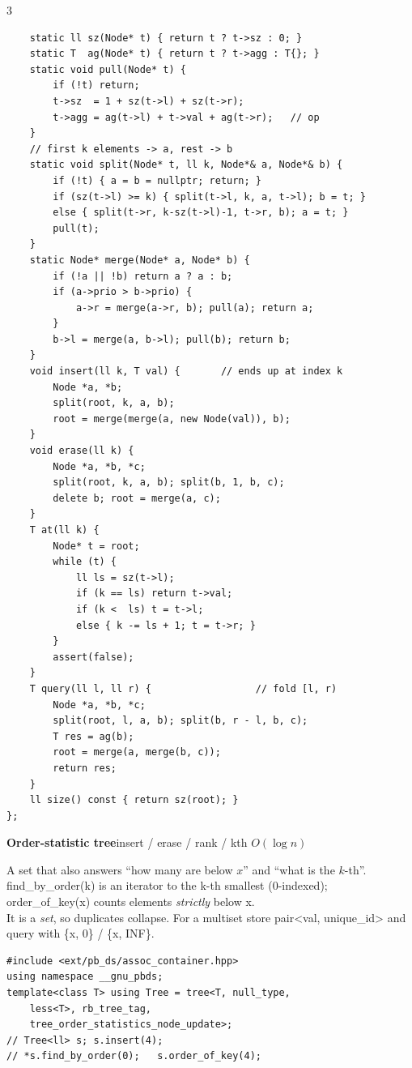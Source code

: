 \documentclass[9pt,a4paper]{extarticle}
\newcommand{\entry}[3]{%
  \addcontentsline{toc}{subsection}{#1}%
  \vspace{0.8ex}%
  \noindent\colorbox{hdbg}{\parbox{\dimexpr\columnwidth-2\fboxsep}{%
    \strut\textbf{#1}\hfill{\footnotesize\textsf{#2}}}}\par
  \vspace{0.4ex}%
  {\footnotesize #3\par}%
}
\newcommand{\code}[1]{{\ttfamily\small #1}}
\begin{document}
\begin{multicols*}{3}
\begin{lstlisting}
    static ll sz(Node* t) { return t ? t->sz : 0; }
    static T  ag(Node* t) { return t ? t->agg : T{}; }
    static void pull(Node* t) {
        if (!t) return;
        t->sz  = 1 + sz(t->l) + sz(t->r);
        t->agg = ag(t->l) + t->val + ag(t->r);   // op
    }
    // first k elements -> a, rest -> b
    static void split(Node* t, ll k, Node*& a, Node*& b) {
        if (!t) { a = b = nullptr; return; }
        if (sz(t->l) >= k) { split(t->l, k, a, t->l); b = t; }
        else { split(t->r, k-sz(t->l)-1, t->r, b); a = t; }
        pull(t);
    }
    static Node* merge(Node* a, Node* b) {
        if (!a || !b) return a ? a : b;
        if (a->prio > b->prio) {
            a->r = merge(a->r, b); pull(a); return a;
        }
        b->l = merge(a, b->l); pull(b); return b;
    }
    void insert(ll k, T val) {       // ends up at index k
        Node *a, *b;
        split(root, k, a, b);
        root = merge(merge(a, new Node(val)), b);
    }
    void erase(ll k) {
        Node *a, *b, *c;
        split(root, k, a, b); split(b, 1, b, c);
        delete b; root = merge(a, c);
    }
    T at(ll k) {
        Node* t = root;
        while (t) {
            ll ls = sz(t->l);
            if (k == ls) return t->val;
            if (k <  ls) t = t->l;
            else { k -= ls + 1; t = t->r; }
        }
        assert(false);
    }
    T query(ll l, ll r) {                  // fold [l, r)
        Node *a, *b, *c;
        split(root, l, a, b); split(b, r - l, b, c);
        T res = ag(b);
        root = merge(a, merge(b, c));
        return res;
    }
    ll size() const { return sz(root); }
};
\end{lstlisting}

\entry{Order-statistic tree}{insert / erase / rank / kth $O(\log n)$}{%
A \code{set} that also answers ``how many are below $x$'' and ``what is the $k$-th''.
\code{find\_by\_order(k)} is an iterator to the \code{k}-th smallest (0-indexed);
\code{order\_of\_key(x)} counts elements \emph{strictly} below \code{x}.\\[0.3ex]
It is a \emph{set}, so duplicates collapse. For a multiset store
\code{pair<val, unique\_id>} and query with \code{\{x, 0\}} / \code{\{x, INF\}}.}

\begin{lstlisting}
#include <ext/pb_ds/assoc_container.hpp>
using namespace __gnu_pbds;
template<class T> using Tree = tree<T, null_type,
    less<T>, rb_tree_tag,
    tree_order_statistics_node_update>;
// Tree<ll> s; s.insert(4);
// *s.find_by_order(0);   s.order_of_key(4);
\end{lstlisting}


\end{multicols*}
\end{document}
